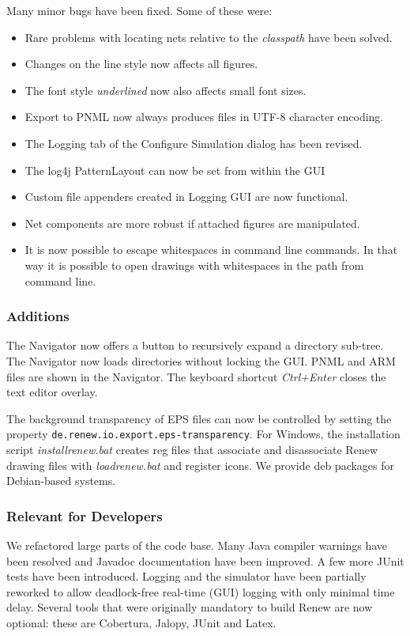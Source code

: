 Many minor bugs
have been fixed. Some of these were:
\begin{itemize}
\item Rare problems with locating nets relative to the \emph{classpath} have been
  solved.
\item Changes on the line style now affects all figures.
\item The font style \emph{underlined} now also affects small font sizes.
\item Export to PNML now always produces files in UTF-8 character
  encoding.
\item The Logging tab of the Configure Simulation dialog has been
  revised.
\item The log4j PatternLayout can now be set from within the GUI
\item Custom file appenders created in Logging GUI are now functional.
\item Net components are more robust if attached figures are manipulated.
\item It is now possible to escape whitespaces in command line commands. 
In that way it is possible to open drawings with whitespaces in the path 
from command line.
\end{itemize}

\subsubsection*{Additions}

The Navigator now offers a button to recursively expand a directory
sub-tree.  The Navigator now loads directories without locking the
GUI. PNML and ARM files are shown in the Navigator.  
The keyboard
shortcut \emph{Ctrl+Enter} closes the text editor overlay.  

The background transparency of EPS files can now be controlled by
setting the property \texttt{de.renew.io.export.eps-transparency}.
For Windows, the installation script \emph{installrenew.bat} creates reg
 files that associate and disassociate Renew drawing files with 
 \emph{loadrenew.bat} and register icons.  
 We provide deb packages for Debian-based systems.


\subsubsection*{Relevant for Developers}


We refactored large parts of the code base.  Many Java compiler
warnings have been resolved and Javadoc documentation have been
improved.  A few more JUnit tests have been introduced.  Logging and
the simulator have been partially reworked to allow deadlock-free
real-time (GUI) logging with only minimal time delay.  Several tools
that were originally mandatory to build Renew are now optional: these
are Cobertura, Jalopy, JUnit and Latex.

